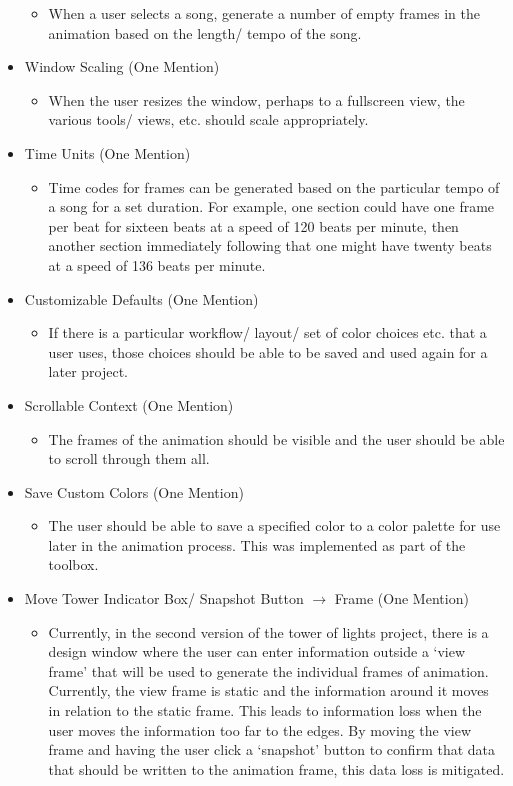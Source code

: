 \documentclass[12pt]{extarticle}
\begin{document}
\begin{itemize}
	\begin{itemize}
		\item When a user selects a song, generate a number of empty frames in the animation based on the length/ tempo of the song.
	\end{itemize}
	\item Window Scaling (One Mention)
	\begin{itemize}
		\item When the user resizes the window, perhaps to a fullscreen view, the various tools/ views, etc. should scale appropriately.
	\end{itemize}
	\item Time Units (One Mention)
	\begin{itemize}
		\item Time codes for frames can be generated based on the particular tempo of a song for a set duration. For example, one section could have one frame per beat for sixteen beats at a speed of 120 beats per minute, then another section immediately following that one might have twenty beats at a speed of 136 beats per minute.
	\end{itemize}
	\item Customizable Defaults (One Mention)
	\begin{itemize}
		\item If there is a particular workflow/ layout/ set of color choices etc. that a user uses, those choices should be able to be saved and used again for a later project.
	\end{itemize}
	\item Scrollable Context (One Mention)
	\begin{itemize}
		\item The frames of the animation should be visible and the user should be able to scroll through them all.
	\end{itemize}
	\item Save Custom Colors (One Mention)
	\begin{itemize}
		\item The user should be able to save a specified color to a color palette for use later in the animation process. This was implemented as part of the toolbox.
	\end{itemize}
	\item Move Tower Indicator Box/ Snapshot Button $\rightarrow$ Frame (One Mention)
	\begin{itemize}
		\item Currently, in the second version of the tower of lights project, there is a design window where the user can enter information outside a `view frame' that will be used to generate the individual frames of animation. Currently, the view frame is static and the information around it moves in relation to the static frame. This leads to information loss when the user moves the information too far to the edges. By moving the view frame and having the user click a `snapshot' button to confirm that data that should be written to the animation frame, this data loss is mitigated.

\end{itemize}
\end{itemize}
\end{document}
